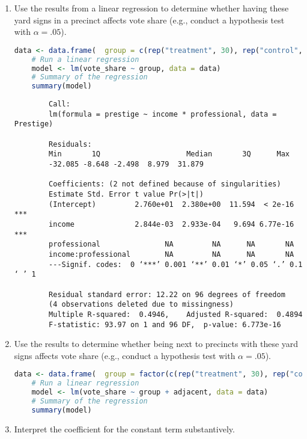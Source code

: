 \documentclass[12pt,letterpaper]{article}
\begin{document}
\vspace{.5cm}
\begin{enumerate}
	\item [(a)] Use the results from a linear regression to determine whether having these yard signs in a precinct affects vote share (e.g., conduct a hypothesis test with $\alpha = .05$).
	
	\newpage		
		\begin{lstlisting}[language=R]
	data <- data.frame(  group = c(rep("treatment", 30), rep("control", 76)),  vote_share = c(0.042, 0.042, rep(NA, 104)),  adjacent = c(rep(NA, 30), rep(1, 76)))
	# Run a linear regression
	model <- lm(vote_share ~ group, data = data)
	# Summary of the regression
	summary(model)
	\end{lstlisting}
	
			\begin{verbatim}
		Call:
		lm(formula = prestige ~ income * professional, data = Prestige)
		
		Residuals:
		Min       1Q   					Median       3Q      Max  
		-32.085 -8.648 -2.498  8.979  31.879 
		
		Coefficients: (2 not defined because of singularities)
		Estimate Std. Error t value Pr(>|t|)    
		(Intercept)         2.760e+01  2.380e+00  11.594  < 2e-16 ***
		income              2.844e-03  2.933e-04   9.694 6.77e-16 ***
		professional               NA         NA      NA       NA    
		income:professional        NA         NA      NA       NA    
		---Signif. codes:  0 ‘***’ 0.001 ‘**’ 0.01 ‘*’ 0.05 ‘.’ 0.1 ‘ ’ 1
		
		Residual standard error: 12.22 on 96 degrees of freedom  
		(4 observations deleted due to missingness)
		Multiple R-squared:  0.4946,	Adjusted R-squared:  0.4894 
		F-statistic: 93.97 on 1 and 96 DF,  p-value: 6.773e-16
	\end{verbatim}
	
	\item [(b)]  Use the results to determine whether being
	next to precincts with these yard signs affects vote
	share (e.g., conduct a hypothesis test with $\alpha = .05$).
	
	\vspace{0.05cm}
			\begin{lstlisting}[language=R]
	data <- data.frame(  group = factor(c(rep("treatment", 30), rep("control", 76))),  vote_share = c(0.042, 0.042, rep(NA, 104)),  adjacent = c(rep(NA, 30), rep(1, 76)))
	# Run a linear regression
	model <- lm(vote_share ~ group + adjacent, data = data)
	# Summary of the regression
	summary(model)
	\end{lstlisting}
	\newpage			
	\item [(c)] Interpret the coefficient for the constant term substantively.
	\vspace{0.05cm}
	

\end{enumerate}
\end{document}
